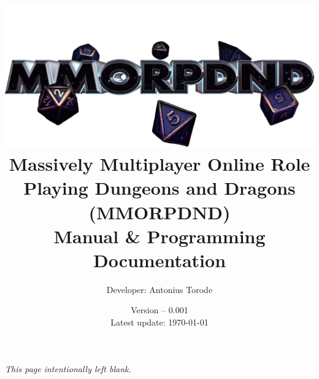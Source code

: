 \documentclass[openany,a4paper,11pt]{book}
\title{\vspace{0.1cm}  \includegraphics[scale=0.18]{./images/man_cover.png} \vspace{.5cm} \\ Massively Multiplayer Online Role Playing Dungeons and Dragons (MMORPDND) \\  Manual \& Programming Documentation}
\author{Developer: Antonius Torode}
\date{Version -- 0.001 \\ Latest update: \today}
\begin{document}
\frontmatter
\maketitle

\tableofcontents
\newpage
\vspace*{\fill}
\begin{center}
	\textit{This page intentionally left blank.}
\end{center}
\vspace*{\fill}

\mainmatter
\pagestyle{fancy}
\fancyhf{}
\fancyhead[RO, LE]{\thepage}








\backmatter


\printindex
\end{document}
